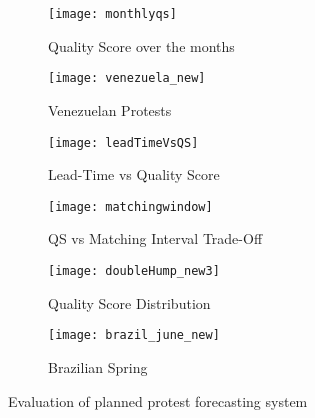 \begin{figure*}
\begin{subfigure}{.70\columnwidth}
    \centering
  \texttt{[image: monthlyqs]}
  \caption{\scriptsize Quality Score over the months}
  \label{fig:monthlyqs}
\end{subfigure}\hspace{.5pt}
\begin{subfigure}{.70\columnwidth}
    \centering
  \texttt{[image: venezuela\_new]}
  \caption{\scriptsize Venezuelan Protests}
  \label{fig:venezuela_feb}
\end{subfigure}\hspace{.5pt}
\begin{subfigure}{.70\columnwidth}
    \centering
  \texttt{[image: leadTimeVsQS]}
  \caption{\scriptsize Lead-Time vs Quality Score}
  \label{fig:leadTimeVsQS}
\end{subfigure}

\begin{subfigure}{.70\columnwidth}
    \centering
  \texttt{[image: matchingwindow]}
  \caption{\scriptsize QS vs Matching Interval Trade-Off}
  \label{fig:matchinginterval}
\end{subfigure}\hspace{.5pt}
\begin{subfigure}{.70\columnwidth}
    \centering
  \texttt{[image: doubleHump\_new3]}
  \caption{\scriptsize Quality Score Distribution}
  \label{fig:doubleHump}
\end{subfigure}\hspace{.5pt}
\begin{subfigure}{.70\columnwidth}
    \centering
  \texttt{[image: brazil\_june\_new]}
  \caption{\scriptsize Brazilian Spring}
  \label{fig:brazil_june}
\end{subfigure}\hspace{.5pt}
\caption{Evaluation of planned protest forecasting system}
\end{figure*}



